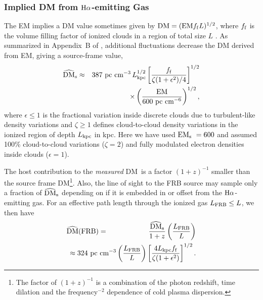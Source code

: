 \documentclass[twocolumn]{aastex61}
\newcommand{\be}{\begin{eqnarray}}
\newcommand{\ee}{\end{eqnarray}}
\newcommand{\Halpha}{\rm H\alpha}
\newcommand{\EM}{{\rm EM}}
\newcommand{\DM}{{\rm DM}}
\newcommand{\DMhatzero}{\rm \widehat{\DM}}
\newcommand{\DMhatFRB}{\rm \widehat{\DM}({\rm FRB})}
\newcommand{\EMs}{{\rm EM}_{\rm s}}
\newcommand{\DMs}{\widehat{\rm DM}_{\rm s}}
\begin{document}
\subsubsection{Implied DM from $\Halpha$-emitting Gas}
The EM implies a DM value sometimes given by $\DM = (\EM f_{\rm f} L)^{1/2}$, where
$f_{\rm f}$ is the volume filling factor of ionized clouds in a region of total size $L$ \citep{reyn77}. As summarized in Appendix~B of \citet[][]{cws+16},  additional fluctuations  decrease the  DM derived from EM, giving a source-frame value,
\be
\DMs &\approx & 
387\ \text{pc cm$^{-3}$}\, 
	L_{\rm kpc}^{1/2}
	\left[ \frac{f_{\rm f}}{\zeta(1+\epsilon^2)/4}\right]^{1/2} \nonumber \\
& & \times \left(\frac{\EM}{600\ \text{pc cm$^{-6}$}} \right)^{1/2},
\label{eq:em2dm}
\ee
 where $\epsilon\le 1$ is the fractional variation inside discrete clouds due to turbulent-like density variations and  $\zeta\ge 1$ defines cloud-to-cloud density variations  in the ionized region of depth  $L_{\rm kpc}$  in kpc. Here we have used $\EMs\ = 600$  and assumed 100\% cloud-to-cloud variations ($\zeta = 2$) and fully modulated electron densities inside clouds ($\epsilon=1$).




The host contribution to the {\it measured} \DM\ is a factor $(1+z)^{-1}$ smaller than the source frame DM\footnote{The factor of $(1+z)^{-1}$ is a combination of the photon redshift, time dilation and the frequency$^{-2}$ dependence of cold plasma dispersion.}.
Also, the line of sight to the  FRB source may  sample only a fraction of  $\DMs$  depending on if
it is embedded in or offset from the $\Halpha$-emitting gas.  For an effective path length through the ionized gas
$L_{\rm FRB} \le L$,  we then have
%
\be
\DMhatFRB &=& \frac{\DMs}{1+z} \left(\frac{L_{\rm FRB}}{L} \right) 
\nonumber \\
&&\hspace{-0.85in}   \approx  324 \ \text{pc cm$^{-3}$}  \left(\frac{L_{\rm FRB}}{L} \right)
\left[\frac{4L_{\rm kpc}f_{\rm f}}{ \zeta(1+\epsilon^2)} \right]^{1/2}.
\ee
\end{document}
